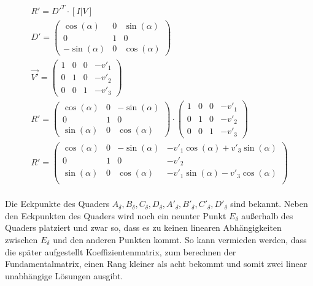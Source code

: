 \begin{gather}		
		R'=D'^T\cdot [I|V]\\
	D'= 
	\begin{pmatrix}
		\cos(\alpha)&0&\sin(\alpha)\\
		0&1&0\\
		-\sin(\alpha)&0&\cos(\alpha)
	\end{pmatrix}\\
	\vec{V'}= 
	\begin{pmatrix}
		1&0&0&-v'_1\\
		0&1&0&-v'_2\\
		0&0&1&-v'_3			
	\end{pmatrix}\\
	R'=		\begin{pmatrix}
		\cos(\alpha)&0&-\sin(\alpha)\\
		0&1&0\\
		\sin(\alpha)&0&\cos(\alpha)
	\end{pmatrix} 
	\cdot
	\begin{pmatrix}
		1&0&0&-v'_1\\
		0&1&0&-v'_2\\
		0&0&1&-v'_3			
	\end{pmatrix}\\
	R'=
	\begin{pmatrix}
		\cos(\alpha)&0&-\sin(\alpha)&-v'_1\cos(\alpha)+v'_3\sin(\alpha)\\
		0&1&0&-v'_2\\
		\sin(\alpha)&0&\cos(\alpha)&-v'_1\sin(\alpha)-v'_3\cos(\alpha)\\
	\end{pmatrix}
\end{gather}\\


Die Eckpunkte des Quaders $A_\delta,B_\delta,C_\delta,D_\delta,A'_\delta,B'_\delta,C'_\delta,D'_\delta$ sind bekannt. Neben den Eckpunkten des Quaders wird noch ein neunter Punkt $E_\delta$ außerhalb des Quaders platziert und zwar so, dass es zu keinen linearen Abhängigkeiten zwischen $E_\delta$ und den anderen Punkten kommt. So kann vermieden werden, dass die später aufgestellt Koeffizientenmatrix, zum berechnen der Fundamentalmatrix, einen Rang kleiner als acht bekommt und somit zwei linear unabhängige Lösungen ausgibt\cite{HZ}. 

